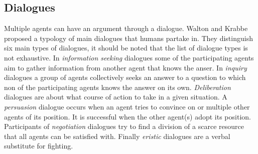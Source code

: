 \documentclass[a4paper]{article}
\begin{document}
\subsection{Dialogues}
Multiple agents can have an argument through a dialogue. Walton and 
Krabbe \cite{walton1995} proposed a typology of main dialogues that humans 
partake in. They distinguish six main types of dialogues, it should be noted 
that the list of dialogue types is not exhaustive. In \emph{information 
seeking} dialogues some of the participating agents aim to gather information 
from another agent that knows the anser. In \emph{inquiry} dialogues a group of 
agents collectively seeks an answer to a question to which non of the 
participating agents knows the answer on its own. \emph{Deliberation} dialogues 
are about what course of action to take in a given situation. A 
\emph{persuasion} dialogue occurs when an agent tries to convince on or 
multiple other agents of its position. It is successful when the other agent(s) 
adopt its position. Participants of \emph{negotiation} dialogues try to find a 
division of a scarce resource that all agents can be satisfied with. Finally 
\emph{eristic} dialogues are a verbal substitute for fighting.



\end{document}
